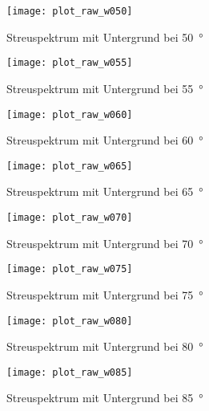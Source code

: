 \documentclass[11pt, ngerman, fleqn, DIV=15, headinclude, BCOR=2cm]{scrreprt}
\begin{document}
\begin{appendix}
\begin{figure}[h]
    \centering
    \texttt{[image: plot\_raw\_w050]}
    \caption{%
	    Streuspektrum mit Untergrund bei \SI{50}{\degree}
    }
    \label{fig:plot_raw_w050}
\end{figure}

\begin{figure}[h]
    \centering
    \texttt{[image: plot\_raw\_w055]}
    \caption{%
	    Streuspektrum mit Untergrund bei \SI{55}{\degree}
    }
    \label{fig:plot_raw_w055}
\end{figure}

\begin{figure}[h]
    \centering
    \texttt{[image: plot\_raw\_w060]}
    \caption{%
	    Streuspektrum mit Untergrund bei \SI{60}{\degree}
    }
    \label{fig:plot_raw_w060}
\end{figure}

\begin{figure}[h]
    \centering
    \texttt{[image: plot\_raw\_w065]}
    \caption{%
	    Streuspektrum mit Untergrund bei \SI{65}{\degree}
    }
    \label{fig:plot_raw_w065}
\end{figure}

\begin{figure}[h]
    \centering
    \texttt{[image: plot\_raw\_w070]}
    \caption{%
	    Streuspektrum mit Untergrund bei \SI{70}{\degree}
    }
    \label{fig:plot_raw_w070}
\end{figure}

\begin{figure}[h]
    \centering
    \texttt{[image: plot\_raw\_w075]}
    \caption{%
	    Streuspektrum mit Untergrund bei \SI{75}{\degree}
    }
    \label{fig:plot_raw_w075}
\end{figure}

\begin{figure}[h]
    \centering
    \texttt{[image: plot\_raw\_w080]}
    \caption{%
	    Streuspektrum mit Untergrund bei \SI{80}{\degree}
    }
    \label{fig:plot_raw_w080}
\end{figure}

\begin{figure}[h]
    \centering
    \texttt{[image: plot\_raw\_w085]}
    \caption{%
	    Streuspektrum mit Untergrund bei \SI{85}{\degree}
    }
    \label{fig:plot_raw_w085}
\end{figure}


\end{appendix}
\end{document}
